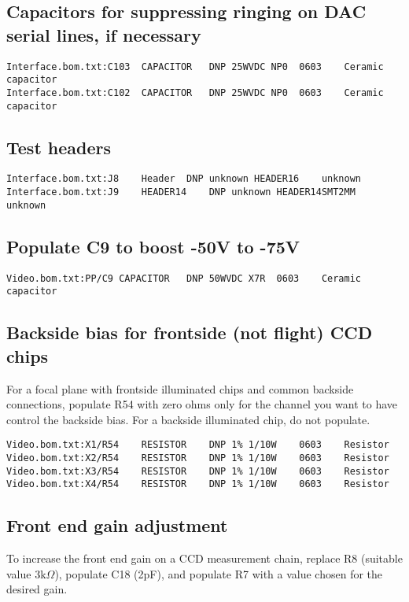 \documentclass[11pt]{article}
\begin{document}
\subsection{Capacitors for suppressing ringing on DAC serial lines, if necessary}
\begin{verbatim}
Interface.bom.txt:C103	CAPACITOR	DNP	25WVDC NP0	0603	Ceramic capacitor	
Interface.bom.txt:C102	CAPACITOR	DNP	25WVDC NP0	0603	Ceramic capacitor	
\end{verbatim}

\subsection{Test headers}
\begin{verbatim}
Interface.bom.txt:J8	Header	DNP	unknown	HEADER16	unknown	
Interface.bom.txt:J9	HEADER14	DNP	unknown	HEADER14SMT2MM	unknown	
\end{verbatim}

\subsection{Populate C9 to boost -50V to -75V}
\begin{verbatim}
Video.bom.txt:PP/C9	CAPACITOR	DNP	50WVDC X7R	0603	Ceramic capacitor	
\end{verbatim}

\subsection{Backside bias for frontside (not flight) CCD chips}
For a focal plane with frontside illuminated chips and 
common backside connections, populate R54 with zero
ohms only for the channel you want to have
control the backside bias. For a backside illuminated
chip, do not populate.
\begin{verbatim}
Video.bom.txt:X1/R54	RESISTOR	DNP	1% 1/10W	0603	Resistor	
Video.bom.txt:X2/R54	RESISTOR	DNP	1% 1/10W	0603	Resistor	
Video.bom.txt:X3/R54	RESISTOR	DNP	1% 1/10W	0603	Resistor	
Video.bom.txt:X4/R54	RESISTOR	DNP	1% 1/10W	0603	Resistor	
\end{verbatim}

\subsection{Front end gain adjustment}

To increase the front end gain on a CCD measurement chain, replace R8 (suitable value 3k$\Omega$), populate C18 (2pF), and populate R7 with a value chosen for the desired gain.
\end{document}
